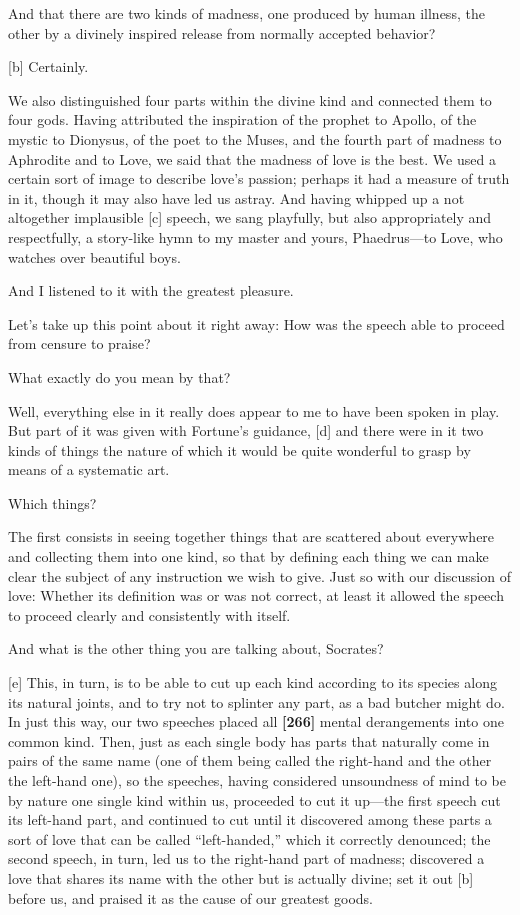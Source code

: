 \saysocrates And that there are two kinds of madness, one produced by human
illness, the other by a divinely inspired release from normally accepted
behavior?

{[}b{]} \sayphaedrus Certainly.

\saysocrates We also distinguished four parts within the divine kind and
connected them to four gods. Having attributed the inspiration of the
prophet to Apollo, of the mystic to Dionysus, of the poet to the Muses,
and the fourth part of madness to Aphrodite and to Love, we said that
the madness of love is the best. We used a certain sort of image to
describe love's passion; perhaps it had a measure of truth in it, though
it may also have led us astray. And having whipped up a not altogether
implausible {[}c{]} speech, we sang playfully, but also appropriately
and respectfully, a story-like hymn to my master and yours,
Phaedrus---to Love, who watches over beautiful boys.

\sayphaedrus And I listened to it with the greatest pleasure.

\saysocrates Let's take up this point about it right away: How was the
speech able to proceed from censure to praise?

\sayphaedrus What exactly do you mean by that?

\saysocrates Well, everything else in it really does appear to me to have
been spoken in play. But part of it was given with Fortune's guidance,
{[}d{]} and there were in it two kinds of things the nature of which it
would be quite wonderful to grasp by means of a systematic art.

\sayphaedrus Which things?

\saysocrates The first consists in seeing together things that are
scattered about everywhere and collecting them into one kind, so that by
defining each thing we can make clear the subject of any instruction we
wish to give. Just so with our discussion of love: Whether its
definition was or was not correct, at least it allowed the speech to
proceed clearly and consistently with itself.

\sayphaedrus And what is the other thing you are talking about, Socrates?

{[}e{]} \saysocrates This, in turn, is to be able to cut up each kind
according to its species along its natural joints, and to try not to
splinter any part, as a bad butcher might do. In just this way, our two
speeches placed all {\bf {[}266{]}} mental derangements into one common
kind. Then, just as each single body has parts that naturally come in
pairs of the same name (one of them being called the right-hand and the
other the left-hand one), so the speeches, having considered unsoundness
of mind to be by nature one single kind within us, proceeded to cut it
up---the first speech cut its left-hand part, and continued to cut until
it discovered among these parts a sort of love that can be called
“left-handed,” which it correctly denounced; the second speech, in turn,
led us to the right-hand part of madness; discovered a love that shares
its name with the other but is actually divine; set it out {[}b{]}
before us, and praised it as the cause of our greatest goods.


